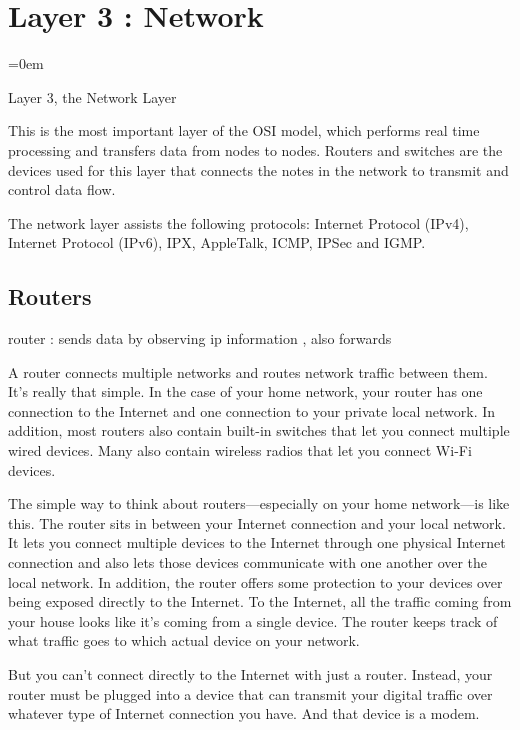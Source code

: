 
\section{Layer 3 : Network}
\label{sec:layer_3_network}
\parindent=0em

Layer 3, the Network Layer

This is the most important layer of the OSI model, which performs real time processing and transfers data from nodes to nodes. Routers and switches are the devices used for this layer that connects the notes in the network to transmit and control data flow.

The network layer assists the following protocols: Internet Protocol (IPv4), Internet Protocol (IPv6), IPX, AppleTalk, ICMP, IPSec and IGMP.


\subsection{Routers}
\label{ssec:routers}

router : sends data by observing ip information , also forwards

A router connects multiple networks and routes network traffic between them.
It’s really that simple. In the case of your home network, your router has one
connection to the Internet and one connection to your private local network. In
addition, most routers also contain built-in switches that let you connect
multiple wired devices. Many also contain wireless radios that let you connect
Wi-Fi devices.

The simple way to think about routers—especially on your home network—is like
this. The router sits in between your Internet connection and your local
network. It lets you connect multiple devices to the Internet through one
physical Internet connection and also lets those devices communicate with one
another over the local network. In addition, the router offers some protection
to your devices over being exposed directly to the Internet. To the Internet,
all the traffic coming from your house looks like it’s coming from a single
device. The router keeps track of what traffic goes to which actual device on
your network.

But you can’t connect directly to the Internet with just a router. Instead, your
router must be plugged into a device that can transmit your digital traffic over
whatever type of Internet connection you have. And that device is a modem.

